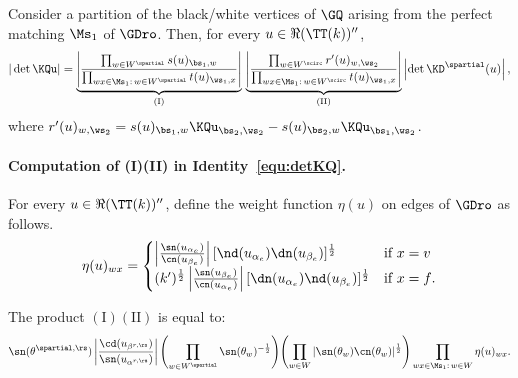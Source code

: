 \documentclass[a4paper,twoside,11pt]{article}
\begin{document}
\begin{cor}\label{cor:det_KQ_caca}
Consider a partition of the black/white vertices of $\GQ$ arising from the perfect matching $\Ms_1$ of $\GDro$.
Then, for every $u\in\Re(\TT(k))''$,
\begin{equation}\label{equ:detKQ}
|\det\KQu|=\underbrace{\left|\frac{\prod_{w\in W^\spartial}s(u)_{\bs_1,w}}{\prod_{wx\in\Ms_1:\,w\in W^\spartial}t(u)_{\ws_1,x}}\right|}_{(\mathrm{I})}\,
\underbrace{\left|\frac{\prod_{w\in W^\scirc} r'(u)_{w,\ws_2}}{
\prod_{wx\in\Ms_1:\,w\in W^\scirc}t(u)_{\ws_1,x}}\right|}_{(\mathrm{II})} \left|\det \KD^\spartial(u)\right|,
\end{equation}
where $r'(u)_{w,\ws_2}=s(u)_{\bs_1,w}\KQu_{\bs_2,\ws_2}-s(u)_{\bs_2,w}\KQu_{\bs_1,\ws_2}$.
\end{cor}


\paragraph{Computation of (I)(II) in Identity~\eqref{equ:detKQ}.}  
For every $u\in\Re(\TT(k))''$,
define the weight function $\eta(u)$ on edges of $\GDro$ as follows.
\begin{equation}\label{equ:def_eta_prime}
\eta(u)_{wx}=
\begin{cases}
 \left|\frac{\sn(u_{\alpha_e})}{\cn(u_{\beta_e})}\right|[\nd(u_{\alpha_e})\dn(u_{\beta_e})]^{\frac{1}{2}} &\text{if $x=v$}\\
 (k')^{\frac{1}{2}}\left|\frac{\sn(u_{\beta_e})}{\cn(u_{\alpha_e})}\right|[\dn(u_{\alpha_e})\nd(u_{\beta_e})]^{\frac{1}{2}} &\text{if $x=f$}.
\end{cases}
\end{equation}

\begin{lem}\label{lem:prod_I_II}
The product $\mathrm{(I)(II)}$ is equal to:
\begin{equation*}
\sn(\theta^{\spartial,\rs})\left|\frac{\cd(u_{\beta^{r,\rs}})}{\sn(u_{\alpha^{r,\rs}})}\right|
\Biggl(\prod_{w\in W^\spartial}\sn(\theta_w)^{-\frac{1}{2}}\Biggr)
\Biggl(\prod_{w\in W}|\sn(\theta_w)\cn(\theta_w)|^{\frac{1}{2}}\Biggr)
\prod_{wx\in \Ms_1:\,w\in W} \eta(u)_{wx}.
\end{equation*}
\end{lem}
\end{document}
